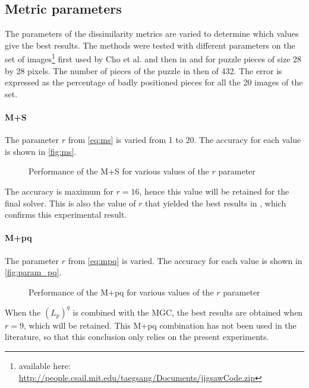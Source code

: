 \subsection{Metric parameters}

The parameters of the dissimilarity metrics are varied to determine which values give the best results. The methods were tested with different parameters on the set of images\footnote{available here: \url{http://people.csail.mit.edu/taegsang/Documents/jigsawCode.zip}} first used by Cho et al. \cite{cho} and then in \cite{robust} and \cite{greedy} for puzzle pieces of size 28 by 28 pixels. The number of pieces of the puzzle in then of 432. The error is expressed as the percentage of badly positioned pieces for all the 20 images of the set. 

\paragraph{M+S} \mbox{}

The parameter $r$ from \autoref{eq:ms} is varied from 1 to 20. The accuracy for each value is shown in \autoref{fig:ms}.

\begin{figure}[H]
\centering

\caption{Performance of the M+S for various values of the $r$ parameter}
\label{fig:ms}
\end{figure}

The accuracy is maximum for $r=16$, hence this value will be retained for the final solver. This is also the value of $r$ that yielded the best results in \cite{robust}, which confirms this experimental result.

\paragraph{M+pq} \mbox{}

The parameter $r$ from \autoref{eq:mpq} is varied. The accuracy for each value is shown in \autoref{fig:param_pq}.


\begin{figure}[H]
\centering

\caption{Performance of the M+pq for various values of the $r$ parameter}
\label{fig:param_pq}
\end{figure}

When the $(L_p)^q$ is combined with the MGC, the best results are obtained when $r=9$, which will be retained. This M+pq combination has not been used in the literature, so that this conclusion only relies on the present experiments.

